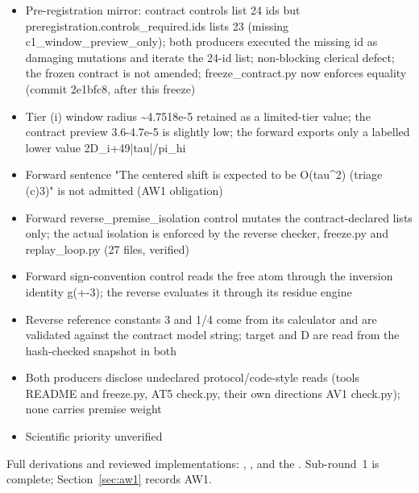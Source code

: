 \begin{gatequote}
\begin{itemize}
R=1831967503411879425147166810021607/10\textasciicircum{}40
\item Pre-registration mirror: contract controls list 24 ids but
preregistration.controls\_required.ids lists 23 (missing
c1\_window\_preview\_only); both producers executed the missing id as damaging
mutations and iterate the 24-id list; non-blocking clerical defect; the frozen
contract is not amended; freeze\_contract.py now enforces equality (commit
2e1bfc8, after this freeze)
\item Tier (i) window radius \textasciitilde{}4.7518e-5 retained as a
limited-tier value; the contract preview 3.6-4.7e-5 is slightly low; the
forward exports only a labelled lower value 2D\_i+49|tau|/pi\_hi
\item Forward sentence "The centered shift is expected to be
O(tau\textasciicircum{}2) (triage (c)3)" is not admitted (AW1 obligation)
\item Forward reverse\_premise\_isolation control mutates the
contract-declared lists only; the actual isolation is enforced by the reverse
checker, freeze.py and replay\_loop.py (27 files, verified)
\item Forward sign-convention control reads the free atom through the
inversion identity g(+-3); the reverse evaluates it through its residue engine
\item Reverse reference constants 3 and 1/4 come from its calculator and are
validated against the contract model string; target and D are read from the
hash-checked snapshot in both
\item Both producers disclose undeclared protocol/code-style reads (tools
README and freeze.py, AT5 check.py, their own direction\textquotesingle{}s AV1 check.py); none
carries premise weight
\item Scientific priority unverified
\end{itemize}
\end{gatequote}
Full derivations and reviewed implementations:
,
,
 and the
. Sub-round~1 is
complete; Section~\ref{sec:aw1} records AW1.
